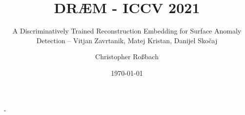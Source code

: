 \documentclass[final]{beamer}
\title[DRÆM Presentation]{DRÆM - ICCV 2021}
\subtitle{A Discriminatively Trained Reconstruction Embedding for Surface Anomaly Detection -- Vitjan Zavrtanik, Matej Kristan, Danijel Skočaj}
\author[Christopher Roßbach]{
Christopher Roßbach\inst{1}}
\institute[FAU]{%
\inst{1} Friedrich-Alexander-Universität Erlangen-Nürnberg, Technische Fakultät
}
\date{\today}
\begin{document}
\begin{frame}[t,titleimage]{-}
\titlepage%
\end{frame}


\end{document}
